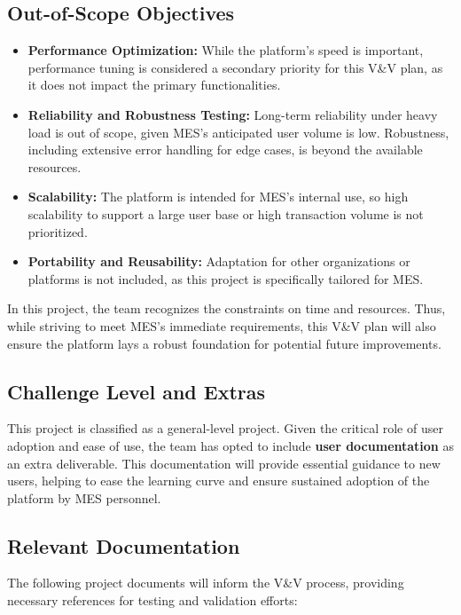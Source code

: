 \documentclass[12pt, titlepage]{article}
\begin{document}
\subsection{Out-of-Scope Objectives}

\begin{itemize}
    \item \textbf{Performance Optimization:} While the platform’s speed is important, performance tuning is considered a secondary priority for this V\&V plan, as it does not impact the primary functionalities.
    \item \textbf{Reliability and Robustness Testing:} Long-term reliability under heavy load is out of scope, given MES's anticipated user volume is low. Robustness, including extensive error handling for edge cases, is beyond the available resources.
    \item \textbf{Scalability:} The platform is intended for MES's internal use, so high scalability to support a large user base or high transaction volume is not prioritized.
    \item \textbf{Portability and Reusability:} Adaptation for other organizations or platforms is not included, as this project is specifically tailored for MES.
\end{itemize}

In this project, the team recognizes the constraints on time and resources. Thus, while striving to meet MES’s immediate requirements, this V\&V plan will also ensure the platform lays a robust foundation for potential future improvements.

\subsection{Challenge Level and Extras}

This project is classified as a general-level project. Given the critical role of user adoption and ease of use, the team has opted to include \textbf{user documentation} as an extra deliverable. This documentation will provide essential guidance to new users, helping to ease the learning curve and ensure sustained adoption of the platform by MES personnel.

\subsection{Relevant Documentation}

The following project documents will inform the V\&V process, providing necessary references for testing and validation efforts:
\end{document}
